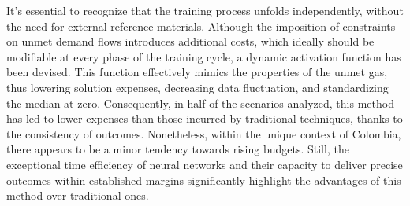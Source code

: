 It's essential to recognize that the training process unfolds independently, without the need for external reference materials. Although the imposition of constraints on unmet demand flows introduces additional costs, which ideally should be modifiable at every phase of the training cycle, a dynamic activation function has been devised. This function effectively mimics the properties of the unmet gas, thus lowering solution expenses, decreasing data fluctuation, and standardizing the median at zero. Consequently, in half of the scenarios analyzed, this method has led to lower expenses than those incurred by traditional techniques, thanks to the consistency of outcomes. Nonetheless, within the unique context of Colombia, there appears to be a minor tendency towards rising budgets. Still, the exceptional time efficiency of neural networks and their capacity to deliver precise outcomes within established margins significantly highlight the advantages of this method over traditional ones.